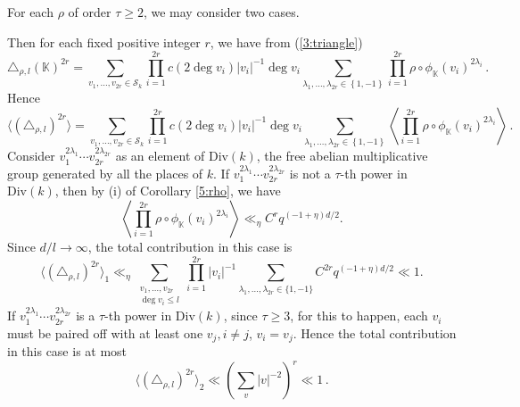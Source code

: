 \documentclass[12pt]{amsart}
\theoremstyle{plain}
\begin{document}
For each $\rho$ of order $\tau \ge 2$, we may consider two cases.

 Then for each fixed positive integer $r$, we have from (\ref{3:triangle}) \[\triangle_{\rho,l}({{\mathbb K}})^{2r} =\sum_{v_1, \ldots, v_{2r} \in {\mathcal{S}_k}} \prod_{i=1}^{2r} c(2 \deg v_i) |v_i|^{-1} \deg v_i \sum_{\lambda_1, \ldots, \lambda_{2r} \in \left\{1,-1\right\}} \prod_{i=1}^{2r} \rho \circ {\phi_{{\mathbb K}}}(v_i)^{2\lambda_i}\,. \]
Hence
\[\langle \left(\triangle_{\rho,l}\right)^{2r} \rangle = \sum_{v_1, \ldots, v_{2r} \in {\mathcal{S}_k}} \prod_{i=1}^{2r} c(2 \deg v_i) |v_i|^{-1} \deg v_i \sum_{\lambda_1, \ldots, \lambda_{2r} \in \left\{1,-1\right\}}  \left\langle \prod_{i=1}^{2r} \rho \circ {\phi_{{\mathbb K}}}(v_i)^{2 \lambda_i}\right\rangle \,. \]
Consider $v_1^{2 \lambda_1} \cdots v_{2r}^{2 \lambda_{2r}}$ as an element of ${\mathrm{Div}(k)}$, the free abelian multiplicative group generated by all the places of $k$. If $v_1^{2\lambda_1} \cdots v_{2r}^{2\lambda_{2r}}$ is not a $\tau$-th power in ${\mathrm{Div}(k)}$, then by (i) of Corollary \ref{5:rho}, we have
\[\left\langle \prod_{i=1}^{2r} \rho \circ {\phi_{{\mathbb K}}}(v_i)^{2 \lambda_i}\right\rangle \ll_{\eta} C^r q^{(-1+\eta)d/2}. \]
Since $d/l \to \infty$, the total contribution in this case is
\[\langle (\triangle_{\rho,l})^{2r} \rangle_1 \ll_{\eta} \sum_{\substack{v_1, \ldots, v_{2r}\\
\deg v_i \le l}} \prod_{i=1}^{2r} |v_i|^{-1} \sum_{\lambda_1,\ldots,\lambda_{2r} \in \{1,-1\}} C^{2r} q^{(-1+\eta)d/2} \ll 1. \]
If $v_1^{2\lambda_1} \cdots v_{2r}^{2\lambda_{2r}}$ is a $\tau$-th power in ${\mathrm{Div}(k)}$, since $\tau \ge 3$, for this to happen, each $v_i$ must be paired off with at least one $v_j, i \ne j$, $v_i=v_j$. Hence the total contribution in this case is at most
\[\langle \left(\triangle_{\rho,l}\right)^{2r} \rangle_2 \ll \left(\sum_{v} |v|^{-2}\right)^{r} \ll 1\,. \]
\end{document}
